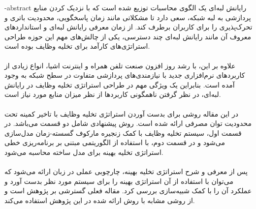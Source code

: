 \esalatPage
\mojavezPage

 \newpage

% 
% 
% 
% 
% 
% 
\fa-abstract{
رایانش لبه‌ای یک الگوی محاسبات توزیع شده است که با نزدیک کردن منابع پردازشی به لبه شبکه، سعی دارد تا مشکلاتی مانند زمان پاسخگویی، محدودیت باتری و تحرک‌پذیری را برای کاربران برطرف کند. از زمان معرفی رایانش لبه‌ای و استانداردهای معروف آن مانند رایانش لبه‌ای چند دسترسی، یکی از چالش‌های مهم این حوزه طراحی استراتژی‌های کارآمد برای تخلیه وظایف بوده است. \\ \\ علاوه بر این، با رشد روز افزون صنعت تلفن همراه و اینترنت اشیا، انواع زیادی از کاربردهای نرم‌افزاری جدید با نیازمندی‌های پردازشی متفاوت در سطح شبکه به وجود آمده است. بنابراین یک ویژگی مهم در طراحی استراتژی تخلیه وظایف در رایانش لبه‌ای، در نظر گرفتن ناهمگونی کاربردها از نظر میزان منابع مورد نیاز است. \\ \\ در این مقاله روشی برای بدست آوردن استراتژی تخلیه وظایف با تاخیر کمینه تحت محدودیت توان مصرفی ارائه شده است. روش پیشنهادی شامل دو قسمت می‌باشد. در قسمت اول، سیستم تخلیه وظایف با کمک زنجیره مارکوف گسسته-زمان مدل‌سازی می‌شود و در قسمت دوم، با استفاده از الگوریتمی مبتنی بر برنامه‌ریزی خطی استراتژی تخلیه بهینه برای مدل ساخته محاسبه می‌شود. \\ \\ پس از معرفی و شرح استراتژی تخلیه بهینه، چارچوبی عملی در زبان  ارائه می‌شود که می‌توان با استفاده از آن استراتژی بهینه را برای سیستم مورد نظر بدست آورد و عملکرد آن را با کمک شبیه‌سازی بررسی کرد. مقاله فعلی گسترشی بر پژوهش \cite{Liu} است و از روشی مشابه با روش ارائه شده در این پژوهش استفاده می‌کند.
}

\abstractPage

\newpage\clearpage